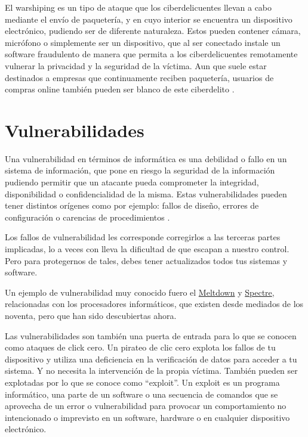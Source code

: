 \documentclass[
  spanish,
  a4paper,
  openany]{book}
\begin{document}
El warshiping es un tipo de ataque que los ciberdelicuentes llevan a cabo mediante el envío de paquetería, y en cuyo interior se encuentra un dispositivo electrónico, pudiendo ser de diferente naturaleza. Estos pueden contener cámara, micrófono o simplemente ser un dispositivo, que al ser conectado instale un software fraudulento de manera que permita a los ciberdelicuentes remotamente vulnerar la privacidad y la seguridad de la víctima. Aun que suele estar destinados a empresas que continuamente reciben paquetería, usuarios de compras online también pueden ser blanco de este ciberdelito \citep{INCI-warshipping}.

\hypertarget{vulnerabilidades}{%
\section{Vulnerabilidades}\label{vulnerabilidades}}

Una vulnerabilidad en términos de informática es una debilidad o fallo en un sistema de información, que pone en riesgo la seguridad de la información pudiendo permitir que un atacante pueda comprometer la integridad, disponibilidad o confidencialidad de la misma. Estas vulnerabilidades pueden tener distintos orígenes como por ejemplo: fallos de diseño, errores de configuración o carencias de procedimientos \citep{INCI-vulnerabilidad}.

Los fallos de vulnerabilidad les corresponde corregirlos a las terceras partes implicadas, lo a veces con lleva la dificultad de que escapan a nuestro control. Pero para protegernos de tales, debes tener actualizados todos tus sistemas y software.

Un ejemplo de vulnerabilidad muy conocido fuero el \href{https://es.wikipedia.org/wiki/Meltdown_(vulnerabilidad)}{Meltdown} y \href{https://es.wikipedia.org/wiki/Spectre_(vulnerabilidad)}{Spectre}, relacionadas con los procesadores informáticos, que existen desde mediados de los noventa, pero que han sido descubiertas ahora.

Las vulnerabilidades son también una puerta de entrada para lo que se conocen como ataques de click cero. Un pirateo de clic cero explota los fallos de tu dispositivo y utiliza una deficiencia en la verificación de datos para acceder a tu sistema. Y no necesita la intervención de la propia víctima. También pueden ser explotadas por lo que se conoce como ``exploit''. Un exploit es un programa informático, una parte de un software o una secuencia de comandos que se aprovecha de un error o vulnerabilidad para provocar un comportamiento no intencionado o imprevisto en un software, hardware o en cualquier dispositivo electrónico.
\end{document}

